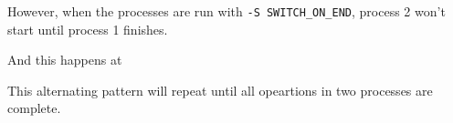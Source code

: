\documentclass[12pt]{article}
\begin{document}
\begin{enumerate}[1.]
\begin{itemize}
\begin{itemize}
            \bigskip

            However, when the processes are run with \texttt{-S SWITCH\_ON\_END}, process 2 won't start until
            process 1 finishes.

            \bigskip

            And this happens at
            \bigskip

            This alternating pattern will repeat until all opeartions in two processes are complete.
        \end{itemize}
    \end{itemize}

\end{enumerate}
\end{document}
